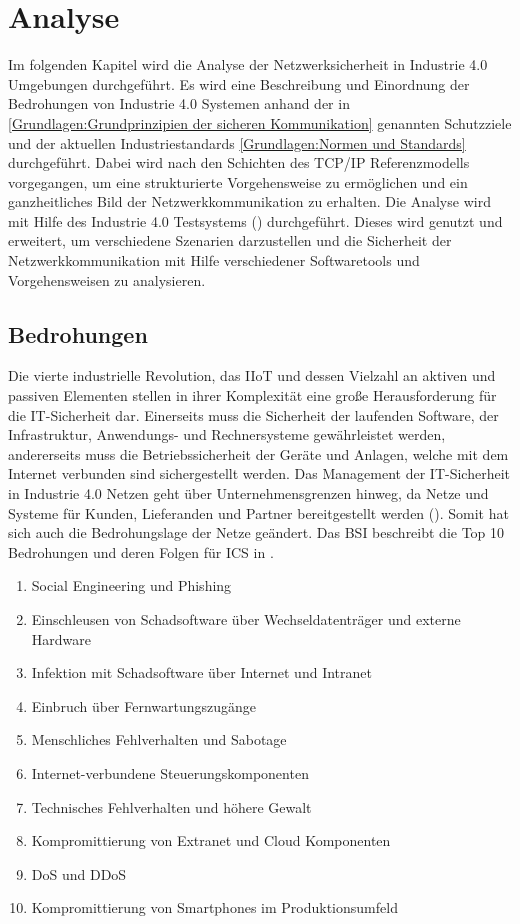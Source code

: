 \chapter{Analyse}
Im folgenden Kapitel wird die Analyse der Netzwerksicherheit in Industrie 4.0 Umgebungen durchgeführt. Es wird eine Beschreibung und Einordnung der Bedrohungen von Industrie 4.0 Systemen anhand der in \autoref{Grundlagen:Grundprinzipien der sicheren Kommunikation} genannten Schutzziele und der aktuellen Industriestandards \autoref{Grundlagen:Normen und Standards} durchgeführt. Dabei wird nach den Schichten des \ac{TCP}/\ac{IP} Referenzmodells vorgegangen, um eine strukturierte Vorgehensweise zu ermöglichen und ein ganzheitliches Bild der Netzwerkkommunikation zu erhalten. Die Analyse wird mit Hilfe des Industrie 4.0 Testsystems (\cite{Weber2018}) durchgeführt. Dieses wird genutzt und erweitert, um verschiedene Szenarien darzustellen und die Sicherheit der Netzwerkkommunikation mit Hilfe verschiedener Softwaretools und Vorgehensweisen zu analysieren.

\section{Bedrohungen}
Die vierte industrielle Revolution, das \ac{IIoT} und dessen Vielzahl an aktiven und passiven Elementen stellen in ihrer Komplexität eine große Herausforderung für die IT-Sicherheit dar. Einerseits muss die Sicherheit der laufenden Software, der Infrastruktur, Anwendungs- und Rechnersysteme gewährleistet werden, andererseits muss die Betriebssicherheit der Geräte und Anlagen, welche mit dem Internet verbunden sind sichergestellt werden. Das Management der IT-Sicherheit in Industrie 4.0 Netzen geht über Unternehmensgrenzen hinweg, da Netze und Systeme für Kunden, Lieferanden und Partner bereitgestellt werden (\cite{DTAG2016}). Somit hat sich auch die Bedrohungslage der Netze geändert. Das \ac{BSI} beschreibt die Top 10 Bedrohungen und deren Folgen für \ac{ICS} in \cite{ICSSec2016}.

\begin{enumerate}
    \item Social Engineering und Phishing
    \item Einschleusen von Schadsoftware über Wechseldatenträger und externe Hardware
    \item Infektion mit Schadsoftware über Internet und Intranet
    \item Einbruch über Fernwartungszugänge
    \item Menschliches Fehlverhalten und Sabotage
    \item Internet-verbundene Steuerungskomponenten
    \item Technisches Fehlverhalten und höhere Gewalt
    \item Kompromittierung von Extranet und Cloud Komponenten
    \item \ac{DoS} und \ac{DDoS}
    \item Kompromittierung von Smartphones im Produktionsumfeld
\end{enumerate}

